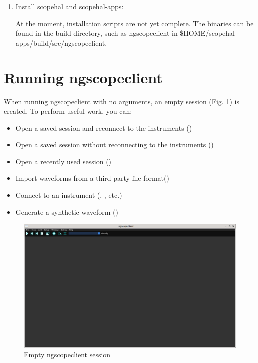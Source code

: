 \begin{enumerate}


\item Install scopehal and scopehal-apps:

At the moment, installation scripts are not yet complete.
The binaries can be found in the build directory, such as ngscopeclient in \$HOME/scopehal-apps/build/src/ngscopeclient.

\end{enumerate}

\section{Running ngscopeclient}

When running ngscopeclient with no arguments, an empty session (Fig. \ref{empty-window}) is created. To perform useful
work, you can:
\begin{itemize}
\item Open a saved session and reconnect to the instruments ()
\item Open a saved session without reconnecting to the instruments ()
\item Open a recently used session ()
\item Import waveforms from a third party file format()
\item Connect to an instrument (, , etc.)
\item Generate a synthetic waveform ()
\end{itemize}

\begin{figure}[h]
\centering
	\includegraphics[width=12cm]{ng-images/empty-window.png}
\caption{Empty ngscopeclient session}
\label{empty-window}
\end{figure}


